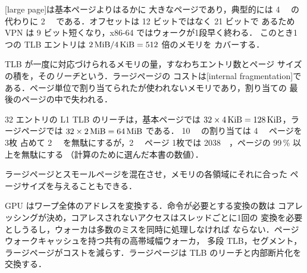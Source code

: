 \documentclass[../main.tex]{subfiles}
\begin{document}
\begin{definition}[ラージページ]
  \label{def:l07-large-page}
  [large page]は基本ページよりはるかに
  大きなページであり，典型的には \SI{4}{\kibi\byte} の代わりに
  \SI{2}{\mebi\byte} である．オフセットは 12 ビットではなく 21 ビットで
  あるため VPN は 9 ビット短くなり，x86-64 ではウォークが1段早く終わる．
  このとき1つの TLB エントリは
  $\SI{2}{\mebi\byte}/\SI{4}{\kibi\byte} = 512$ 倍のメモリを
  カバーする．
\end{definition}

TLB が一度に対応づけられるメモリの量，すなわちエントリ数とページ
サイズの積を，その\emph{リーチ}という．ラージページの
コストは[internal fragmentation]で
ある．ページ単位で割り当てられたが使われないメモリであり，割り当ての
最後のページの中で失われる．

\begin{example}
  \label{ex:l07-large-pages}
  32 エントリの L1 TLB のリーチは，基本ページでは
  $32 \times \SI{4}{\kibi\byte} = \SI{128}{\kibi\byte}$，ラージページでは
  $32 \times \SI{2}{\mebi\byte} = \SI{64}{\mebi\byte}$ である．
  \SI{10}{\kibi\byte} の割り当ては \SI{4}{\kibi\byte} ページを3枚
  占めて \SI{2}{\kibi\byte} を無駄にするが，\SI{2}{\mebi\byte} ページ
  1枚では \SI{2038}{\kibi\byte}，ページの 99\,\% 以上を無駄にする
  （計算のために選んだ本書の数値）．
\end{example}

ラージページとスモールページを混在させ，メモリの各領域にそれに合った
ページサイズを与えることもできる．

\begin{keypoint}
  GPU はワープ全体のアドレスを変換する．命令が必要とする変換の数は
  コアレッシングが決め，コアレスされないアクセスはスレッドごとに1回の
  変換を必要としうるし，ウォーカは多数のミスを同時に処理しなければ
  ならない．ページウォークキャッシュを持つ共有の高帯域幅ウォーカ，
  多段 TLB，セグメント，ラージページがコストを減らす．ラージページは
  TLB のリーチと内部断片化を交換する．
\end{keypoint}
\end{document}
